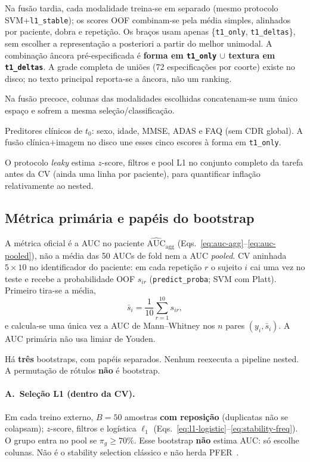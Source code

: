 \documentclass[review]{elsarticle}
\newcommand{\code}[1]{\texttt{#1}}
\begin{document}
	Na fusão tardia, cada modalidade treina-se em separado (mesmo protocolo SVM+\code{l1\_stable}); os scores OOF combinam-se pela média simples, alinhados por paciente, dobra e repetição.
	Os braços usam apenas \{\code{t1\_only}, \code{t1\_deltas}\}, sem escolher a representação a posteriori a partir do melhor unimodal.
	A combinação âncora pré-especificada é \textbf{forma em \code{t1\_only} $\cup$ textura em \code{t1\_deltas}}.
	A grade completa de uniões (72 especificações por coorte) existe no disco; no texto principal reporta-se a âncora, não um ranking.
	
	Na fusão precoce, colunas das modalidades escolhidas concatenam-se num único espaço e sofrem a mesma seleção/classificação.
	
	Preditores clínicos de $t_0$: sexo, idade, MMSE, ADAS e FAQ (sem CDR global).
	A fusão clínica$+$imagem no disco une esses cinco escores à forma em \code{t1\_only}.
	
	O protocolo \emph{leaky} estima $z$-score, filtros e pool L1 no conjunto completo da tarefa antes da CV (ainda uma linha por paciente), para quantificar inflação relativamente ao nested.
	
	\subsection{Métrica primária e papéis do bootstrap}
\label{sec:stats}

A métrica oficial é a AUC no paciente $\widehat{\mathrm{AUC}}_{\mathrm{agg}}$ (Eqs.~\ref{eq:auc-agg}--\ref{eq:auc-pooled}), não a média das 50 AUCs de fold nem a AUC \emph{pooled}.
CV aninhada $5\times 10$ no identificador do paciente: em cada repetição $r$ o sujeito $i$ cai uma vez no teste e recebe a probabilidade OOF $s_{ir}$ (\code{predict\_proba}; SVM com Platt).
Primeiro tira-se a média,
\[
	\bar{s}_i = \frac{1}{10}\sum_{r=1}^{10} s_{ir},
\]
e calcula-se uma única vez a AUC de Mann--Whitney nos $n$ pares $(y_i,\bar{s}_i)$.
A AUC primária não usa limiar de Youden.

Há \textbf{três} bootstraps, com papéis separados.
Nenhum reexecuta a pipeline nested.
A permutação de rótulos \textbf{não} é bootstrap.

\paragraph{A.~Seleção L1 (dentro da CV).}
Em cada treino externo, $B=50$ amostras \textbf{com reposição} (duplicatas não se colapsam); $z$-score, filtros e logística $\ell_1$ (Eqs.~\ref{eq:l1-logistic}--\ref{eq:stability-freq}).
O grupo entra no pool se $\pi_g\ge 70\%$.
Esse bootstrap \textbf{não} estima AUC: só escolhe colunas.
Não é o stability selection clássico e não herda PFER~\cite{bach-2008,meinshausen-2010}.
\end{document}

